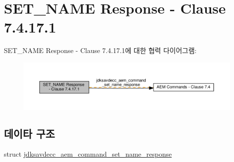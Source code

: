 \hypertarget{group__command__set__name__response}{}\section{S\+E\+T\+\_\+\+N\+A\+ME Response -\/ Clause 7.4.17.1}
\label{group__command__set__name__response}
S\+E\+T\+\_\+\+N\+A\+ME Response -\/ Clause 7.4.17.1에 대한 협력 다이어그램\+:
\nopagebreak
\begin{figure}[H]
\begin{center}
\leavevmode
\includegraphics[width=350pt]{group__command__set__name__response}
\end{center}
\end{figure}
\subsection*{데이타 구조}
\begin{DoxyCompactItemize}
\item 
struct \hyperlink{structjdksavdecc__aem__command__set__name__response}{jdksavdecc\+\_\+aem\+\_\+command\+\_\+set\+\_\+name\+\_\+response}
\end{DoxyCompactItemize}
